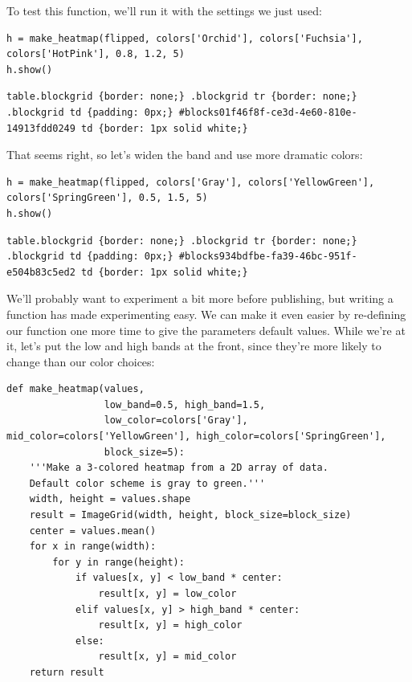 \documentclass{book}
\begin{document}
To test this function, we'll run it with the settings we just used:

\begin{verbatim}
h = make_heatmap(flipped, colors['Orchid'], colors['Fuchsia'], colors['HotPink'], 0.8, 1.2, 5)
h.show()
\end{verbatim}

\begin{verbatim}
table.blockgrid {border: none;} .blockgrid tr {border: none;} .blockgrid td {padding: 0px;} #blocks01f46f8f-ce3d-4e60-810e-14913fdd0249 td {border: 1px solid white;}
\end{verbatim}

That seems right, so let's widen the band and use more dramatic colors:

\begin{verbatim}
h = make_heatmap(flipped, colors['Gray'], colors['YellowGreen'], colors['SpringGreen'], 0.5, 1.5, 5)
h.show()
\end{verbatim}

\begin{verbatim}
table.blockgrid {border: none;} .blockgrid tr {border: none;} .blockgrid td {padding: 0px;} #blocks934bdfbe-fa39-46bc-951f-e504b83c5ed2 td {border: 1px solid white;}
\end{verbatim}

We'll probably want to experiment a bit more before publishing, but
writing a function has made experimenting easy. We can make it even
easier by re-defining our function one more time to give the parameters
default values. While we're at it, let's put the low and high bands at
the front, since they're more likely to change than our color choices:

\begin{verbatim}
def make_heatmap(values,
                 low_band=0.5, high_band=1.5,
                 low_color=colors['Gray'], mid_color=colors['YellowGreen'], high_color=colors['SpringGreen'],
                 block_size=5):
    '''Make a 3-colored heatmap from a 2D array of data.
    Default color scheme is gray to green.'''
    width, height = values.shape
    result = ImageGrid(width, height, block_size=block_size)
    center = values.mean()
    for x in range(width):
        for y in range(height):
            if values[x, y] < low_band * center:
                result[x, y] = low_color
            elif values[x, y] > high_band * center:
                result[x, y] = high_color
            else:
                result[x, y] = mid_color
    return result
\end{verbatim}
\end{document}
